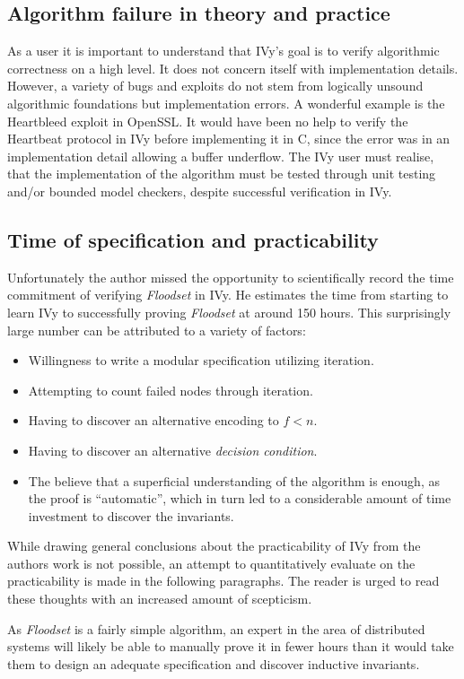 \documentclass[fleqn]{article}
\begin{document}
\subsection{Algorithm failure in theory and practice}
As a user it is important to understand that IVy's goal is to verify algorithmic correctness on a high level. It does not concern itself with implementation details. However, a variety of bugs and exploits do not stem from logically unsound algorithmic foundations but implementation errors. A wonderful example is the Heartbleed exploit in OpenSSL. It would have been no help to verify the Heartbeat protocol in IVy before implementing it in C, since the error was in an implementation detail allowing a buffer underflow. The IVy user must realise, that the implementation of the algorithm must be tested through unit testing and/or bounded model checkers, despite successful verification in IVy.

\subsection{Time of specification and practicability}
Unfortunately the author missed the opportunity to scientifically record the time commitment of verifying \textit{Floodset} in IVy. He estimates the time from starting to learn IVy to successfully proving \textit{Floodset} at around 150 hours. This surprisingly large number can be attributed to a variety of factors:
\begin{itemize}
  \item Willingness to write a modular specification utilizing iteration.
  \item Attempting to count failed nodes through iteration.
  \item Having to discover an alternative encoding to $f < n$.
  \item Having to discover an alternative \textit{decision condition}.
  \item The believe that a superficial understanding of the algorithm is enough, as the proof is ``automatic'', which in turn led to a considerable amount of time investment to discover the invariants.
\end{itemize}
While drawing general conclusions about the practicability of IVy from the authors work is not possible, an attempt to quantitatively evaluate on the practicability is made in the following paragraphs. The reader is urged to read these thoughts with an increased amount of scepticism.

As \textit{Floodset} is a fairly simple algorithm, an expert in the area of distributed systems will likely be able to manually prove it in fewer hours than it would take them to design an adequate specification and discover inductive invariants.
\end{document}
